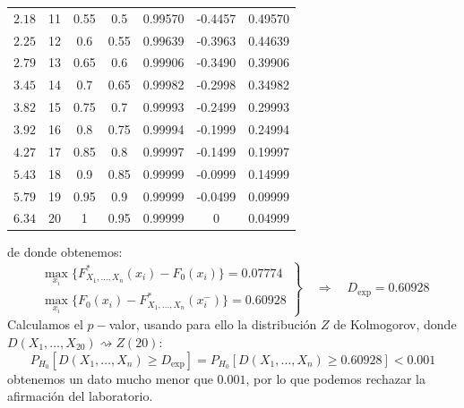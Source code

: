 \begin{ejercicio}
\begin{table}[H]
\begin{tabular}{|c|c|c|c|c|c|c|}
        $2.18$ & 11& 0.55& 0.5  & 0.99570 & -0.4457 & 0.49570\\
        $2.25$ & 12& 0.6 & 0.55 & 0.99639 & -0.3963 & 0.44639\\
        $2.79$ & 13& 0.65& 0.6  & 0.99906 & -0.3490 & 0.39906\\
        $3.45$ & 14& 0.7 & 0.65 & 0.99982 & -0.2998 & 0.34982\\
        $3.82$ & 15& 0.75& 0.7  & 0.99993 & -0.2499 & 0.29993\\
        $3.92$ & 16& 0.8 & 0.75 & 0.99994 & -0.1999 & 0.24994\\
        $4.27$ & 17& 0.85& 0.8  & 0.99997 & -0.1499 & 0.19997\\
        $5.43$ & 18& 0.9 & 0.85 & 0.99999 & -0.0999 & 0.14999\\
        $5.79$ & 19& 0.95& 0.9  & 0.99999 & -0.0499 & 0.09999\\
        $6.34$ & 20& 1   & 0.95 & 0.99999 & 0       & 0.04999\\
        \hline
    \end{tabular}
    \end{table}
    \noindent
    de donde obtenemos:
    \begin{equation*}
        \left.\begin{array}{l}
            \max\limits_{x_i}\{F_{X_1,\ldots,X_n}^\ast(x_i)-F_0(x_i)\} = 0.07774 \\
            \max\limits_{x_i}\{F_0(x_i)-F_{X_1,\ldots,X_n}^\ast(x_i^-)\} = 0.60928 
        \end{array}\right\} \quad\Longrightarrow\quad D_{\text{exp}} = 0.60928
    \end{equation*}
    Calculamos el $p-$valor, usando para ello la distribución $Z$ de Kolmogorov, donde $D(X_1,\ldots,X_{20})\rightsquigarrow Z(20)$:
    \begin{equation*}
        P_{H_0}[D(X_1,\ldots,X_n)\geq D_{\text{exp}}] = P_{H_0}[D(X_1,\ldots,X_n)\geq 0.60928] < 0.001
    \end{equation*}
    obtenemos un dato mucho menor que $0.001$, por lo que podemos rechazar la afirmación del laboratorio.
\end{ejercicio}

